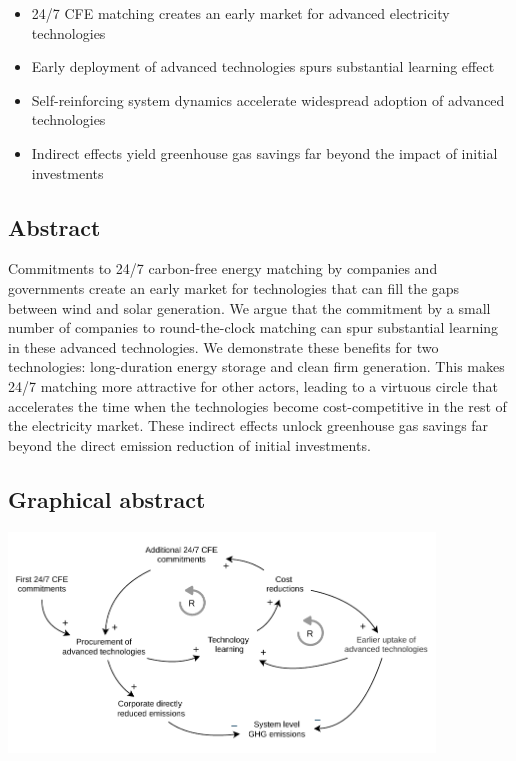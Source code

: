 \documentclass[pdflatex,sn-basic, Numbered]{sn-jnl}
\theoremstyle{thmstyleone}%
\theoremstyle{thmstyletwo}%
\theoremstyle{thmstylethree}%
\begin{document}
\begin{itemize}
\item 24/7 CFE matching creates an early market for advanced electricity technologies
\item Early deployment of advanced technologies spurs substantial learning effect
\item Self-reinforcing system dynamics accelerate widespread adoption of advanced technologies
\item Indirect effects yield greenhouse gas savings far beyond the impact of initial investments
\end{itemize}


\subsection*{Abstract}
Commitments to 24/7 carbon-free energy matching by companies and governments create an early market for technologies that can fill the gaps between wind and solar generation.
We argue that the commitment by a small number of companies to round-the-clock matching can spur substantial learning in these advanced technologies.
We demonstrate these benefits for two technologies: long-duration energy storage and clean firm generation.
This makes 24/7 matching more attractive for other actors, leading to a virtuous circle that accelerates the time when the technologies become cost-competitive in the rest of the electricity market.
These indirect effects unlock greenhouse gas savings far beyond the direct emission reduction of initial investments.


\subsection*{Graphical abstract}

\begin{center}
    \includegraphics[width=0.85\textwidth]{images/virtuous_dynamics.pdf}
\end{center}
\end{document}
